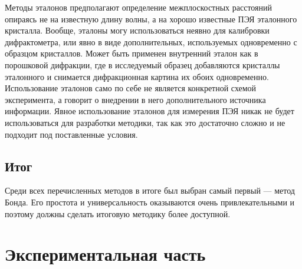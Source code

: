 \documentclass[a4paper,14pt]{extarticle}
\begin{document}
Методы эталонов предполагают определение межплоскостных расстояний опираясь не на известную длину волны, а на хорошо известные ПЭЯ эталонного кристалла.
Вообще, эталоны могу использоваться неявно для калибровки дифрактометра, или явно в виде дополнительных, используемых одновременно с образцом кристаллов.
Может быть применен внутренний эталон как в порошковой дифракции, где в исследуемый образец добавляются кристаллы эталонного и снимается дифракционная картина их обоих одновременно.
Использование эталонов само по себе не является конкретной схемой эксперимента, а говорит о внедрении в него дополнительного источника информации.
Явное использование эталонов для измерения ПЭЯ никак не будет использоваться для разработки методики, так как это достаточно сложно и не подходит под поставленные условия.

\subsection{Итог}

Среди всех перечисленных методов в итоге был выбран самый первый --- метод Бонда.
Его простота и универсальность оказываются очень привлекательными и поэтому должны сделать итоговую методику более доступной.

\section{Экспериментальная часть}
\end{document}
